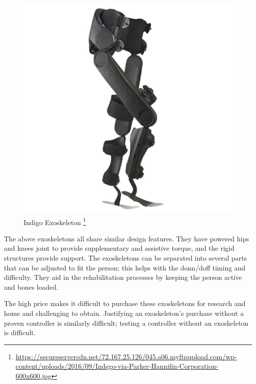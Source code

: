  \begin{figure}[H]
     \centering
     \includegraphics[scale=0.6]{images/background/Indego-via-Parker-Hannifin-Corporation-600x600.jpg}
     \caption[Indigo Exoskeleton]{Indigo Exoskeleton \protect\footnote{\url{https://secureservercdn.net/72.167.25.126/045.a06.myftpupload.com/wp-content/uploads/2016/09/Indego-via-Parker-Hannifin-Corporation-600x600.jpg}}}
     \label{fig:indigo}
 \end{figure}
 
 
 The above exoskeletons all share similar design features. They have powered hips and knees joint to provide supplementary and assistive torque, and the rigid structures provide support. The exoskeletons can be separated into several parts that can be adjusted to fit the person; this helps with the donn/doff timing and difficulty. They aid in the rehabilitation processes by keeping the person active and bones loaded.  
 
The high price makes it difficult to purchase these exoskeletons for research and home and challenging to obtain. Justifying an exoskeleton's purchase without a proven controller is similarly difficult; testing a controller without an exoskeleton is difficult.
 

